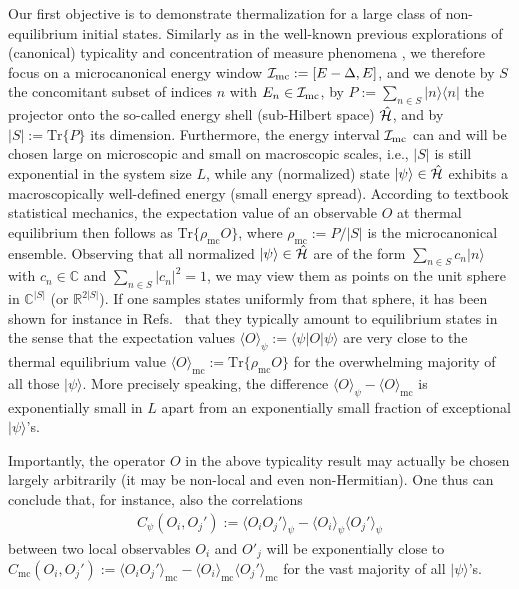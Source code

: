 \documentclass[twocolumn,aps,prb,floatfix,superscriptaddress]{revtex4-2}
\newcommand{\<}{\left\langle}	%
\renewcommand{\>}{\right\rangle}	%
\newcommand{\Imc}{{\cal I}_{\mathrm{mc}}}
\newcommand{\RR}{{\mathbb R}}
\newcommand{\CC}{{\mathbb C}}
\newcommand{\tr}{\mbox{Tr}}
\newcommand{\hr}{{\cal H}}
\newcommand{\Omc}{\langle O\rangle_{\!\mathrm{mc}}}
\newcommand{\mic}{\mathrm{mc}}
\newcommand{\rhomic}{\rho_{\mathrm{mc}}}
\begin{document}
Our first objective is to demonstrate thermalization
for a large class of non-equilibrium initial states.
Similarly as in the well-known previous explorations 
of (canonical) typicality and concentration of 
measure phenomena \cite{llo88,gol06,pop06},
we therefore focus on a microcanonical
energy window $\Imc:=[E-\Delta,E]$,
and we denote by $S$ the concomitant 
subset of indices $n$ with  $E_n\in \Imc$,
by $P:=\sum_{n\in S}|n\rangle\langle n|$
the projector onto the so-called energy 
shell (sub-Hilbert space) $\hat \hr$, and 
by $|S|:=\tr\{P\}$ its dimension.
Furthermore, the energy interval $\Imc$ 
can and will be chosen large on microscopic 
and small on macroscopic scales, 
i.e., $|S|$ is still exponential in the system size
$L$, while any (normalized) state 
$|\psi\rangle\in\hat \hr$ exhibits a macroscopically 
well-defined energy (small energy spread).
According to textbook statistical mechanics,
the expectation value of an observable $O$
at thermal equilibrium then follows as 
$\tr\{\rhomic O\}$, where $\rhomic:=P/|S|$ is
the microcanonical ensemble.
Observing that all normalized 
$|\psi\rangle\in\hat \hr$ are of the form 
$\sum_{n\in S} c_n|n\rangle$
with $c_n\in\CC$ and $\sum_{n\in S} |c_n|^2=1$, 
we may view them as points on the unit 
sphere in $\CC^{|S|}$ 
(or
$\RR^{2|S|}$).
If one samples states uniformly from that sphere,
it has been shown for instance in Refs.~\cite{llo88,gol06,pop06}
that they typically amount to equilibrium states 
in the sense that the expectation values 
$\langle O\rangle_{\!\psi}:=\langle \psi|O|\psi\rangle$ 
are very close to the thermal equilibrium value
$\Omc:=\tr\{\rhomic O\}$
for the overwhelming majority of all those $|\psi\rangle$.
More precisely speaking, the difference 
$\langle O\rangle_{\!\psi}-\Omc$
is exponentially small in 
$L$ apart from an exponentially small fraction of 
exceptional $|\psi\rangle$'s.

Importantly, the operator $O$ in the above
typicality result may actually be chosen largely arbitrarily
(it may be non-local and even non-Hermitian).
One thus can conclude that, for instance, also
the correlations 
\begin{eqnarray}
C_{\!\psi}(O_i,O_j'):= \langle O_iO_j'\rangle_{\!\psi} - \langle O_i\rangle_{\!\psi} \langle O_j'\rangle_{\!\psi}
\label{zz2}
\end{eqnarray}
between two local observables $O_i$ and $O'_j$ will be 
exponentially close to
$C_{\!\mic}(O_i,O_j'):=\langle O_iO_j'\rangle_{\!\mic}- \langle O_i\rangle_{\!\mic}\langle O_j'\rangle_{\!\mic}$
for the 
vast majority of all $|\psi\rangle$'s.
\end{document}
